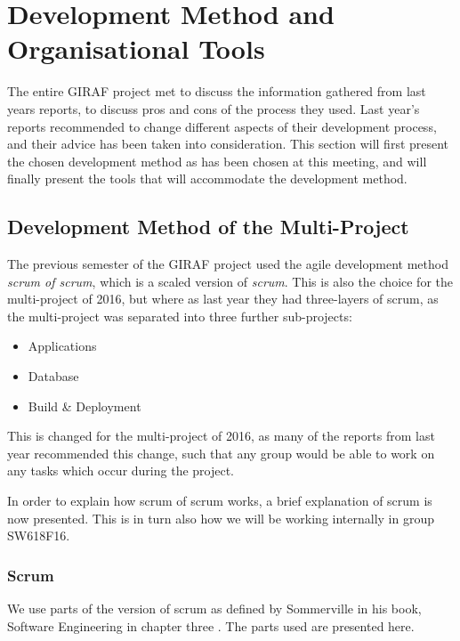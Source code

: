 \section{Development Method and Organisational Tools}
The entire GIRAF project met to discuss the information gathered from last years reports, to discuss pros and cons of the process they used.
Last year's reports recommended to change different aspects of their development process, and their advice has been taken into consideration.
This section will first present the chosen development method as has been chosen at this meeting, and will finally present the tools that will accommodate the development method.


\subsection*{Development Method of the Multi-Project}
The previous semester of the GIRAF project used the agile development method \textit{scrum of scrum}, which is a scaled version of \textit{scrum}.
This is also the choice for the multi-project of 2016, but where as last year they had three-layers of scrum, as the multi-project was separated into three further sub-projects:
\begin{itemize}
	\item Applications
	\item Database
	\item Build \& Deployment
\end{itemize}

This is changed for the multi-project of 2016, as many of the reports from last year recommended this change, such that any group would be able to work on any tasks which occur during the project. 

In order to explain how scrum of scrum works, a brief explanation of scrum is now presented.
This is in turn also how we will be working internally in group SW618F16. 


\subsubsection*{Scrum}

We use parts of the version of scrum as defined by Sommerville in his book, Software Engineering in chapter three \cite{SEBOOK}.
The parts used are presented here.

